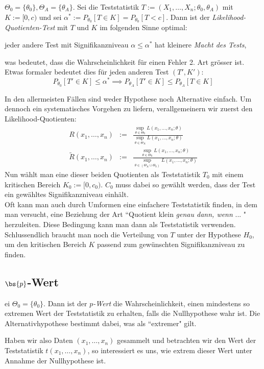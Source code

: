 \begin{satz}
$\Theta_0 = \{\theta_0\}, \Theta_A = \{\theta_A\}$. Sei die Teststatistik $T := (X_1,\dots, X_n; \theta_0, \theta_A)$ mit $K:=[0,c)$ und sei $\alpha^* := P_{\theta_0} [T \in K] = P_{\theta_0}[T < c]$. Dann ist der \textit{Likelihood-Quotienten-Test} mit $T$ und $K$ im folgenden Sinne optimal:
\begin{center}
jeder andere Test mit Signifikanzniveau $\alpha \leq \alpha^*$ hat kleinere \textit{Macht des Tests},
\end{center}
was bedeutet, dass die Wahrscheinlichkeit für einen Fehler 2. Art grösser ist. Etwas formaler bedeutet dies für jeden anderen Test $(T',K')$:
$$ P_{\theta_0} [T' \in K] \leq \alpha^* \implies P_{\theta_A}[T' \in K] \leq P_{\theta_A} [T\in K]$$
\end{satz}
In den allermeisten Fällen sind weder Hypothese noch Alternative einfach. Um dennoch ein systematisches Vorgehen zu liefern, verallgemeinern wir zuerst den Likelihood-Quotienten:
\begin{eqnarray*}
R(x_1,\dots, x_n) & := & \frac{\sup_{\theta \in \Theta_0} L(x_1,\dots, x_n;\theta)}{\sup_{\theta \in \Theta_A} L(x_1,\dots, x_n;\theta)} \\
\widetilde{R}(x_1,\dots, x_n) & := & \frac{\sup_{\theta \in \Theta_0} L(x_1,\dots, x_n;\theta)}{\sup_{\theta \in (\Theta_A \cup \Theta_0)} L(x_1,\dots, x_n;\theta)}
\end{eqnarray*}
Nun wählt man eine dieser beiden Quotienten als Teststatistik $T_0$ mit einem kritischen Bereich $K_0:=[0,c_0)$. $C_0$ muss dabei so gewählt werden, dass der Test ein gewähltes Signifikanzniveau einhält.\\

Oft kann man auch durch Umformen eine einfachere Teststatistik finden, in dem man versucht, eine Beziehung der Art ``Quotient klein \textit{genau dann, wenn} ... " herzuleiten. Diese Bedingung kann man dann als Teststatistik verwenden. Schlussendlich braucht man noch die Verteilung von $T$ unter der Hypothese $H_0$, um den kritischen Bereich $K$ passend zum gewünschten Signifikanzniveau zu finden.

\subsection{$\bs{p}$-Wert}
\begin{definition}
ei $\Theta_0 = \{\theta_0\}$. Dann ist der $p$\textit{-Wert} die Wahrscheinlichkeit, einen mindestens so extremen Wert der Teststatistik zu erhalten, falls die Nullhypothese wahr ist. Die Alternativhypothese bestimmt dabei, was als ``extremer" gilt.
\end{definition}
Haben wir also Daten $(x_1,\dots,x_n)$ gesammelt und betrachten wir den Wert der Teststatistik $t(x_1,\dots,x_n)$, so interessiert es uns, wie extrem dieser Wert unter Annahme der Nullhypothese ist. \\

